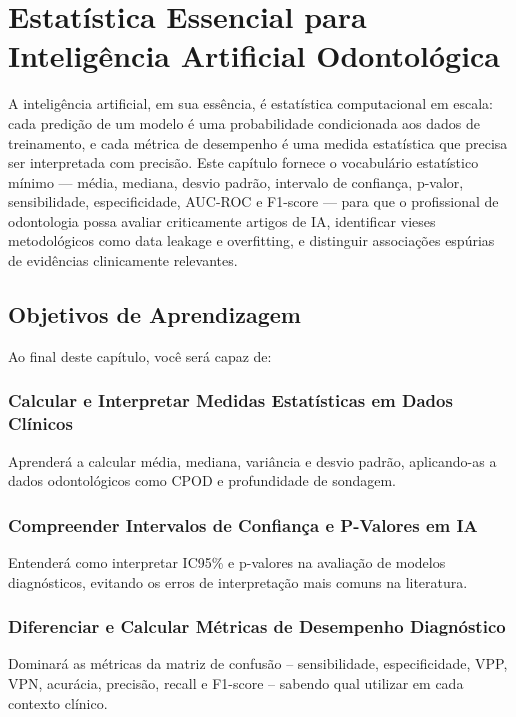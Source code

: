 
\chapter{Estatística Essencial para Inteligência Artificial Odontológica}
\label{cap:estatistica-essencial}

\nivelbasico

A inteligência artificial, em sua essência, é estatística computacional em escala: cada predição de um modelo é uma probabilidade condicionada aos dados de treinamento, e cada métrica de desempenho é uma medida estatística que precisa ser interpretada com precisão. Este capítulo fornece o vocabulário estatístico mínimo — média, mediana, desvio padrão, intervalo de confiança, p-valor, sensibilidade, especificidade, AUC-ROC e F1-score — para que o profissional de odontologia possa avaliar criticamente artigos de IA, identificar vieses metodológicos como data leakage e overfitting, e distinguir associações espúrias de evidências clinicamente relevantes.

\section{Objetivos de Aprendizagem}

Ao final deste capítulo, você será capaz de:

\subsection{Calcular e Interpretar Medidas Estatísticas em Dados Clínicos}
Aprenderá a calcular média, mediana, variância e desvio padrão, aplicando-as a dados odontológicos como CPOD e profundidade de sondagem.

\subsection{Compreender Intervalos de Confiança e P-Valores em IA}
Entenderá como interpretar IC95\% e p-valores na avaliação de modelos diagnósticos, evitando os erros de interpretação mais comuns na literatura.

\subsection{Diferenciar e Calcular Métricas de Desempenho Diagnóstico}
Dominará as métricas da matriz de confusão -- sensibilidade, especificidade, VPP, VPN, acurácia, precisão, recall e F1-score -- sabendo qual utilizar em cada contexto clínico.

